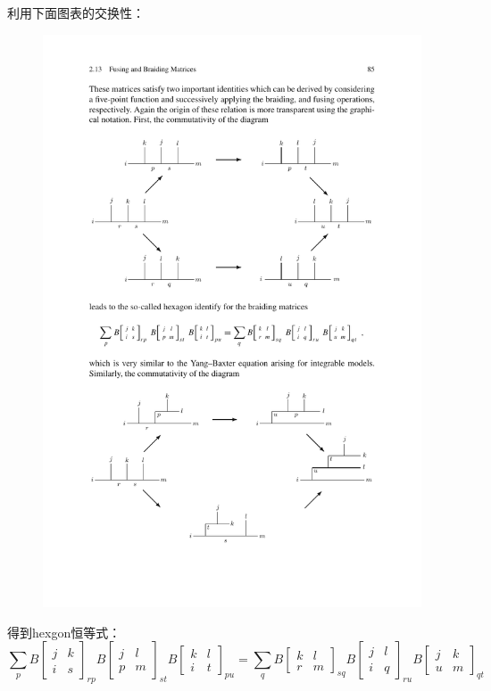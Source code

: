 利用下面图表的交换性：
\begin{figure}[H]
	\centering
	\includegraphics{figs/fig13.pdf}
\end{figure}
得到hexgon恒等式：
\begin{equation}
	\boxed{
		\sum_{p} B\left[\begin{array}{cc}
			j & k \\
			i & s
		\end{array}\right]_{r p} B\left[\begin{array}{cc}
			j & l \\
			p & m
		\end{array}\right]_{s t} B\left[\begin{array}{cc}
			k & l \\
			i & t
		\end{array}\right]_{p u}=\sum_{q} B\left[\begin{array}{cc}
			k & l \\
			r & m
		\end{array}\right]_{s q} B\left[\begin{array}{cc}
			j & l \\
			i & q
		\end{array}\right]_{r u} B\left[\begin{array}{cc}
			j & k \\
			u & m
		\end{array}\right]_{q t}
	}
\end{equation}
